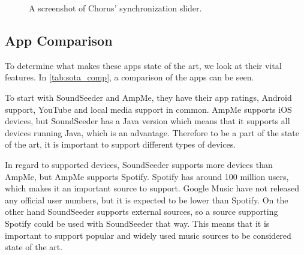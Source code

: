 \begin{figure}[h!]
\begin{minipage}[b]{0.45\textwidth}
        \caption{A screenshot of Chorus' synchronization slider.}\label{fig:chorus_slider}
    \end{minipage}
\end{figure}

\subsection{App Comparison}\label{ssec:app_comparison}
To determine what makes these apps state of the art,
we look at their vital features.
In \cref{tab:sota_comp}, a comparison of the apps can be seen. 

To start with SoundSeeder and AmpMe, they have their app ratings, Android support, YouTube and local media support in common.
AmpMe supports iOS devices, but SoundSeeder has a Java version which means that it supports all devices running Java, which is an advantage. 
Therefore to be a part of the state of the art, it is important to support different types of devices.

In regard to supported devices, SoundSeeder supports more devices than AmpMe, but AmpMe supports Spotify.
Spotify has around 100 million users, which makes it an important source to support\cite{spotify_subscribers}.
Google Music have not released any official user numbers, but it is expected to be lower than Spotify\cite{googlem_subscribers}.
On the other hand SoundSeeder supports external sources, so a source supporting Spotify could be used with SoundSeeder that way.
This means that it is important to support popular and widely used music sources to be considered state of the art.

